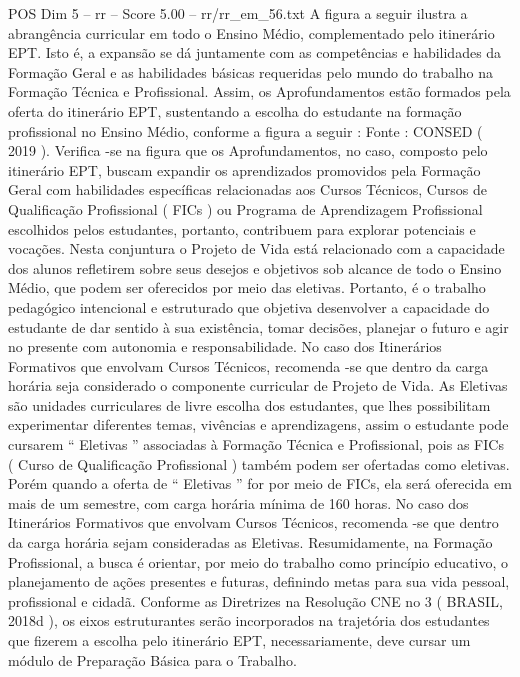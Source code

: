 \begin{textsample}{POS Dim 5 – rr – Score 5.00 – rr/rr\_em\_56.txt}
A figura a seguir ilustra a abrangência curricular em todo o Ensino Médio, complementado pelo itinerário EPT.
Isto é, a expansão se dá juntamente com as competências e habilidades da Formação Geral e as habilidades básicas requeridas pelo mundo do trabalho na Formação Técnica e Profissional.
Assim, os Aprofundamentos estão formados pela oferta do itinerário EPT, sustentando a escolha do estudante na formação profissional no Ensino Médio, conforme a figura a seguir : Fonte : CONSED ( 2019 ).
Verifica -se na figura que os Aprofundamentos, no caso, composto pelo itinerário EPT, buscam expandir os aprendizados promovidos pela Formação Geral com habilidades específicas relacionadas aos Cursos Técnicos, Cursos de Qualificação Profissional ( FICs ) ou Programa de Aprendizagem Profissional escolhidos pelos estudantes, portanto, contribuem para explorar potenciais e vocações.
Nesta conjuntura o Projeto de Vida está relacionado com a capacidade dos alunos refletirem sobre seus desejos e objetivos sob alcance de todo o Ensino Médio, que podem ser oferecidos por meio das eletivas.
Portanto, é o trabalho pedagógico intencional e estruturado que objetiva desenvolver a capacidade do estudante de dar sentido à sua existência, tomar decisões, planejar o futuro e agir no presente com autonomia e responsabilidade.
No caso dos Itinerários Formativos que envolvam Cursos Técnicos, recomenda -se que dentro da carga horária seja considerado o componente curricular de Projeto de Vida.
As Eletivas são unidades curriculares de livre escolha dos estudantes, que lhes possibilitam experimentar diferentes temas, vivências e aprendizagens, assim o estudante pode cursarem “ Eletivas ” associadas à Formação Técnica e Profissional, pois as FICs ( Curso de Qualificação Profissional ) também podem ser ofertadas como eletivas.
Porém quando a oferta de “ Eletivas ” for por meio de FICs, ela será oferecida em mais de um semestre, com carga horária mínima de 160 horas.
No caso dos Itinerários Formativos que envolvam Cursos Técnicos, recomenda -se que dentro da carga horária sejam consideradas as Eletivas.
Resumidamente, na Formação Profissional, a busca é orientar, por meio do trabalho como princípio educativo, o planejamento de ações presentes e futuras, definindo metas para sua vida pessoal, profissional e cidadã.
Conforme as Diretrizes na Resolução CNE no 3 ( BRASIL, 2018d ), os eixos estruturantes serão incorporados na trajetória dos estudantes que fizerem a escolha pelo itinerário EPT, necessariamente, deve cursar um módulo de Preparação Básica para o Trabalho.

\end{textsample}
